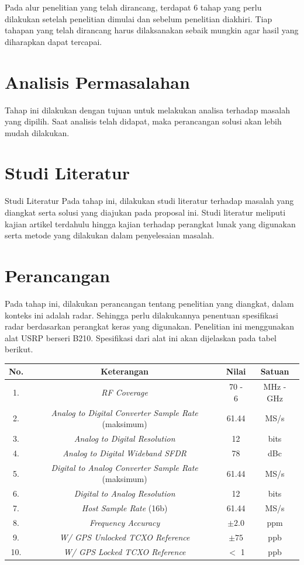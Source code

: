 Pada alur penelitian yang telah dirancang, terdapat 6 tahap yang perlu dilakukan setelah penelitian dimulai dan sebelum penelitian diakhiri. Tiap tahapan yang telah dirancang harus dilaksanakan sebaik mungkin agar hasil yang diharapkan dapat tercapai.

\section{Analisis Permasalahan}
Tahap ini dilakukan dengan tujuan untuk melakukan analisa terhadap masalah yang dipilih. Saat analisis telah didapat, maka perancangan solusi akan lebih mudah dilakukan.

\section{Studi Literatur}Studi Literatur
Pada tahap ini, dilakukan studi literatur terhadap masalah yang diangkat serta solusi yang diajukan pada proposal ini. Studi literatur meliputi kajian artikel terdahulu hingga kajian terhadap perangkat lunak yang digunakan serta metode yang dilakukan dalam penyelesaian masalah.
	
\section{Perancangan}
Pada tahap ini, dilakukan perancangan tentang penelitian yang diangkat, dalam konteks ini adalah radar. Sehingga perlu dilakukannya penentuan spesifikasi radar berdasarkan perangkat keras yang digunakan. Penelitian ini menggunakan alat USRP berseri B210.  Spesifikasi dari alat ini akan dijelaskan pada tabel berikut.

\begin{longtable}{|c|c|c|c|}
	\hline
	No. & Keterangan & Nilai & Satuan \\
	\hline
	1. & \textit{RF Coverage} & 70 - 6 & MHz - GHz \\
	\hline
	2. & \textit{Analog to Digital Converter Sample Rate} (maksimum) & 61.44 & MS/s \\
	\hline
	3. & \textit{Analog to Digital Resolution}  & 12 & bits	\\
	\hline
	4. &\textit{Analog to Digital Wideband SFDR} & 78 & dBc \\
	\hline
	5. & \textit{Digital to Analog Converter Sample Rate} (maksimum) & 61.44 & MS/s \\
	\hline
	6. & \textit{Digital to Analog Resolution}  & 12 & bits	\\
	\hline
	7. & \textit{Host Sample Rate} (16b) & 61.44 & MS/s \\
	\hline
	8. & \textit{Frequency Accuracy} & $\pm 2.0$ & ppm \\
	\hline
	9. &  \textit{W/ GPS Unlocked TCXO Reference} & $\pm 75$ & ppb \\
	\hline
	10. & \textit{W/ GPS Locked TCXO Reference} & $<$ 1 & ppb \\ \hline
\end{longtable}

